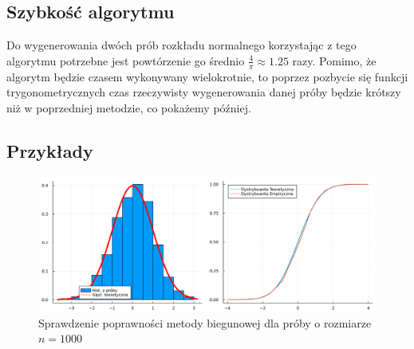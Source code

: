 \documentclass[12pt]{mwrep}
\begin{document}
	\subsection{Szybkość algorytmu}
	\noindent Do wygenerowania dwóch prób rozkładu normalnego korzystając z tego algorytmu potrzebne jest powtórzenie go średnio $\frac{4}{\pi}\approx1.25$ razy. Pomimo, że algorytm będzie czasem wykonywany wielokrotnie, to poprzez pozbycie się funkcji trygonometrycznych czas rzeczywisty wygenerowania danej próby będzie krótszy niż w poprzedniej metodzie, co pokażemy później.
	
	\subsection{Przykłady}

	\begin{figure}[H]\caption{Sprawdzenie poprawności metody biegunowej dla próby o rozmiarze $n=1000$}\label{fig:pol}
		\includegraphics[width=\columnwidth]{fig/fig_pol.png}
	\end{figure}
\end{document}
